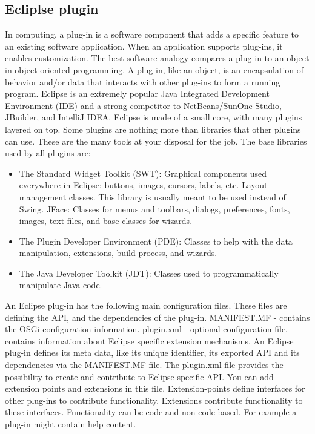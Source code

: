\subsection{Ecliplse plugin}
	
	In computing, a plug-in is a software component that adds a specific feature to an existing software application. 
When an application supports plug-ins, it enables customization. 
	The best software analogy compares a plug-in to an object in object-oriented
	programming. A plug-in, like an object, is an encapsulation of behavior and/or data that interacts with other plug-ins to form a running program.
	Eclipse is an extremely popular Java Integrated Development Environment (IDE)
and a strong competitor to NetBeans/SunOne Studio, JBuilder, and IntelliJ IDEA.
	Eclipse is made of a small core, with many plugins layered on top. Some plugins are nothing more than libraries that other plugins can use.
These are the many tools at your disposal for the job. The base libraries used by all plugins are:

	\begin{itemize}
	\item The Standard Widget Toolkit (SWT): Graphical components used everywhere
in Eclipse: buttons, images, cursors, labels, etc. Layout management classes. This library is usually meant to be used instead of Swing.
JFace: Classes for menus and toolbars, dialogs, preferences, fonts, images,
text files, and base classes for wizards.
	\item The Plugin Developer Environment (PDE): Classes to help with the data
manipulation, extensions, build process, and wizards.
	\item The Java Developer Toolkit (JDT): Classes used to programmatically
manipulate Java code.
	\end{itemize}
	
	An Eclipse plug-in has the following main configuration files. These files are
defining the API, and the dependencies of the plug-in. MANIFEST.MF - contains the OSGi configuration information.
plugin.xml - optional configuration file, contains information about Eclipse specific extension mechanisms.
An Eclipse plug-in defines its meta data, like its unique identifier, its exported API and its dependencies via the MANIFEST.MF file.
The plugin.xml file provides the possibility to create and contribute to Eclipse specific API. You can add extension points and extensions in this file.
Extension-points define interfaces for other plug-ins to contribute functionality. Extensions contribute functionality to these interfaces. 
Functionality can be code and non-code based. For example a plug-in might
contain help content.

